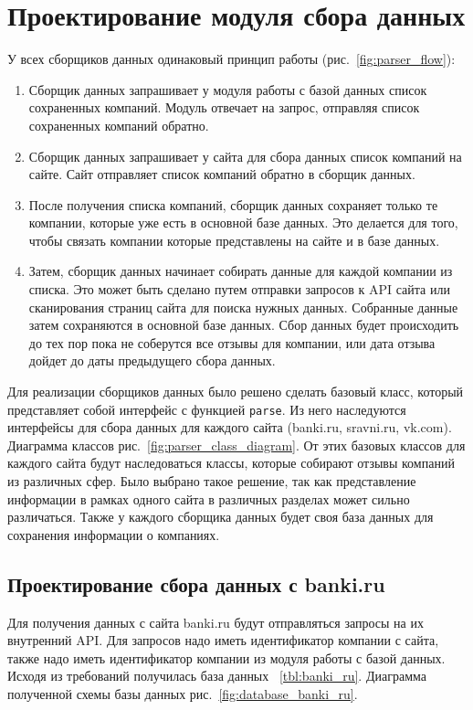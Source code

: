 \documentclass[PI, VKR]{HSEUniversity}
\begin{document}
\section{Проектирование модуля сбора данных}
\label{sec:orgfac2bda}
У всех сборщиков данных одинаковый принцип работы (рис.~\ref{fig:parser_flow}):
\begin{enumerate}
\item Сборщик данных запрашивает у модуля работы с базой данных список сохраненных компаний. Модуль отвечает на запрос, отправляя список сохраненных компаний обратно.
\item Сборщик данных запрашивает у сайта для сбора данных список компаний на сайте. Сайт отправляет список компаний обратно в сборщик данных.
\item После получения списка компаний, сборщик данных сохраняет только те компании, которые уже есть в основной базе данных. Это делается для того, чтобы связать компании которые представлены на сайте и в базе данных.
\item Затем, сборщик данных начинает собирать данные для каждой компании из списка. Это может быть сделано путем отправки запросов к API сайта или сканирования страниц сайта для поиска нужных данных. Собранные данные затем сохраняются в основной базе данных. Сбор данных будет происходить до тех пор пока не соберутся все отзывы для компании, или дата отзыва дойдет до даты предыдущего сбора данных.
\end{enumerate}

Для реализации сборщиков данных было решено сделать базовый класс, который представляет собой интерфейс с функцией \texttt{parse}. Из него наследуются интерфейсы для сбора данных для каждого сайта (banki.ru, sravni.ru, vk.com). Диаграмма классов рис.~\ref{fig:parser_class_diagram}. От этих базовых классов для каждого сайта будут наследоваться классы, которые собирают отзывы компаний из различных сфер. Было выбрано такое решение, так как представление информации в рамках одного сайта в различных разделах может сильно различаться. Также у каждого сборщика данных будет своя база данных для сохранения информации о компаниях.

\subsection{Проектирование сбора данных с banki.ru}
\label{sec:org1d14c37}
Для получения данных с сайта banki.ru будут отправляться запросы на их внутренний API. Для запросов надо иметь идентификатор компании с сайта, также надо иметь идентификатор компании из модуля работы с базой данных. Исходя из требований получилась база данных ~\ref{tbl:banki_ru}. Диаграмма полученной схемы базы данных рис.~\ref{fig:database_banki_ru}.
\end{document}
